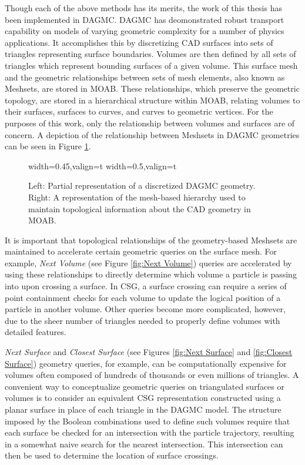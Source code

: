 Though each of the above methods has its merits, the work of this thesis has
been implemented in DAGMC. DAGMC has deomonstrated robust transport capability
on models of varying geometric complexity for a number of physics
applications. It accomplishes this by discretizing CAD surfaces into sets of
triangles representing surface boundaries. Volumes are then defined by all sets
of triangles which represent bounding surfaces of a given volume. This surface
mesh and the geometric relationships between sets of mesh elements, also known
as Meshsets, are stored in MOAB. These relationships, which preserve the geometric topology,
are stored in a hierarchical structure within MOAB, relating volumes to their
surfaces, surfaces to curves, and curves to geometric vertices. For the purposes
of this work, only the relationship between volumes and surfaces are of
concern. A depiction of the relationship between Meshsets in DAGMC geometries
can be seen in Figure \ref{fig:dagmc_geom_example}.

\begin{figure}
  \centering
  {width=0.45\textwidth,valign=t}
  {width=0.5\textwidth,valign=t}
  \caption[The DAGMC data model in MOAB.]{Left: Partial representation of a discretized DAGMC geometry. Right:
    A representation of the mesh-based hierarchy used to maintain topological
    information about the CAD geometry in MOAB.}
  \label{fig:dagmc_geom_example}
\end{figure}

It is important that topological relationships of the geometry-based Meshsets
are maintained to accelerate certain geometric queries on the surface mesh. For
example, \textit{Next Volume} (see Figure \ref{fig:Next Volume}) queries are
accelerated by using these relationships to directly determine which volume a
particle is passing into upon crossing a surface. In CSG, a surface crossing can
require a series of point containment checks for each volume to update the
logical position of a particle in another volume. Other queries become more
complicated, however, due to the sheer number of triangles needed to properly
define volumes with detailed features.

\textit{Next Surface} and \textit{Closest Surface} (see Figures \ref{fig:Next
  Surface} and \ref{fig:Closest Surface}) geometry queries, for example, can be
computationally expensive for volumes often composed of hundreds of thousands or
even millions of triangles. A convenient way to conceptualize geometric queries
on triangulated surfaces or volumes is to consider an equivalent CSG
representation constructed using a planar surface in place of each triangle in
the DAGMC model. The structure imposed by the Boolean combinations used to
define such volumes require that each surface be checked for an intersection
with the particle trajectory, resulting in a somewhat naive search for the
nearest intersection. This intersection can then be used to
determine the location of surface crossings.

